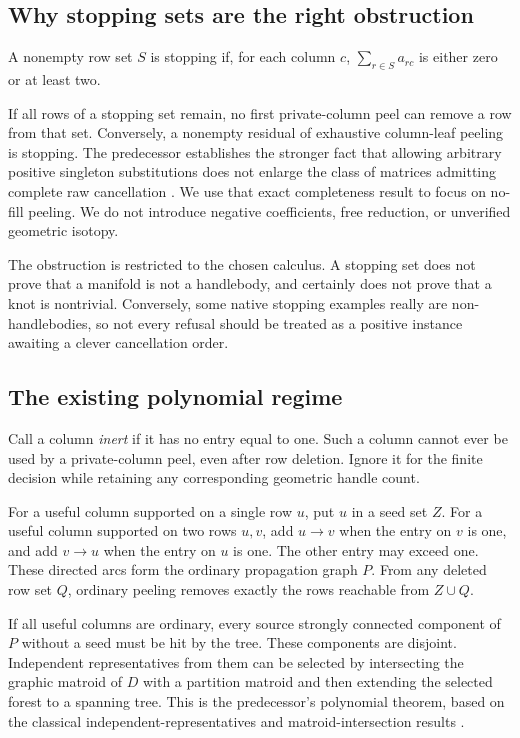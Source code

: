 \subsection{Why stopping sets are the right obstruction}

\begin{definition}
A nonempty row set $S$ is stopping if, for each column $c$,
$\sum_{r\in S}a_{rc}$ is either zero or at least two.
\end{definition}

If all rows of a stopping set remain, no first private-column peel can
remove a row from that set.  Conversely, a nonempty residual of exhaustive
column-leaf peeling is stopping.  The predecessor establishes the stronger
fact that allowing arbitrary positive singleton substitutions does not
enlarge the class of matrices admitting complete raw cancellation
\cite{IncomingPositive2026,IncomingForests2026}.  We use that exact
completeness result to focus on no-fill peeling.  We do not introduce
negative coefficients, free reduction, or unverified geometric isotopy.

The obstruction is restricted to the chosen calculus.  A stopping set
does not prove that a manifold is not a handlebody, and certainly does
not prove that a knot is nontrivial.  Conversely, some native stopping
examples really are non-handlebodies, so not every refusal should be
treated as a positive instance awaiting a clever cancellation order.

\subsection{The existing polynomial regime}

Call a column \emph{inert} if it has no entry equal to one.  Such a column
cannot ever be used by a private-column peel, even after row deletion.
Ignore it for the finite decision while retaining any corresponding
geometric handle count.

For a useful column supported on a single row $u$, put $u$ in a seed set
$Z$.  For a useful column supported on two rows $u,v$, add $u\to v$ when
the entry on $v$ is one, and add $v\to u$ when the entry on $u$ is one.
The other entry may exceed one.  These directed arcs form the ordinary
propagation graph $P$.  From any deleted row set $Q$, ordinary peeling
removes exactly the rows reachable from $Z\cup Q$.

If all useful columns are ordinary, every source strongly connected
component of $P$ without a seed must be hit by the tree.  These components
are disjoint.  Independent representatives from them can be selected by
intersecting the graphic matroid of $D$ with a partition matroid and then
extending the selected forest to a spanning tree.  This is the predecessor's
polynomial theorem, based on the classical independent-representatives
and matroid-intersection results
\cite{Rado1942,Edmonds1979,Lawler1975,IncomingForests2026}.

